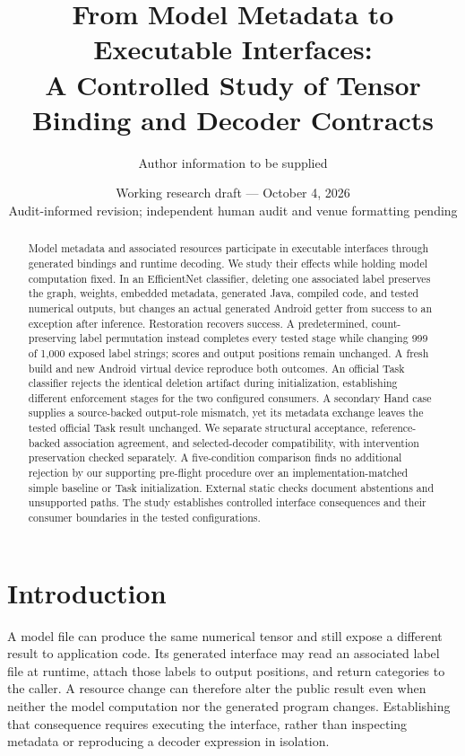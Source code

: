\documentclass[10pt,twocolumn,letterpaper]{article}
\title{From Model Metadata to Executable Interfaces:\\A Controlled Study of Tensor Binding and Decoder Contracts}
\author{Author information to be supplied}
\date{Working research draft --- October 4, 2026\\\small Audit-informed revision; independent human audit and venue formatting pending}
\begin{document}
\maketitle

\begin{abstract}
Model metadata and associated resources participate in executable interfaces through generated bindings and runtime decoding. We study their effects while holding model computation fixed. In an EfficientNet classifier, deleting one associated label preserves the graph, weights, embedded metadata, generated Java, compiled code, and tested numerical outputs, but changes an actual generated Android getter from success to an exception after inference. Restoration recovers success. A predetermined, count-preserving label permutation instead completes every tested stage while changing 999 of 1,000 exposed label strings; scores and output positions remain unchanged. A fresh build and new Android virtual device reproduce both outcomes. An official Task classifier rejects the identical deletion artifact during initialization, establishing different enforcement stages for the two configured consumers. A secondary Hand case supplies a source-backed output-role mismatch, yet its metadata exchange leaves the tested official Task result unchanged. We separate structural acceptance, reference-backed association agreement, and selected-decoder compatibility, with intervention preservation checked separately. A five-condition comparison finds no additional rejection by our supporting pre-flight procedure over an implementation-matched simple baseline or Task initialization. External static checks document abstentions and unsupported paths. The study establishes controlled interface consequences and their consumer boundaries in the tested configurations.
\end{abstract}

\section{Introduction}
A model file can produce the same numerical tensor and still expose a different result to application code. Its generated interface may read an associated label file at runtime, attach those labels to output positions, and return categories to the caller. A resource change can therefore alter the public result even when neither the model computation nor the generated program changes. Establishing that consequence requires executing the interface, rather than inspecting metadata or reproducing a decoder expression in isolation.
\end{document}
